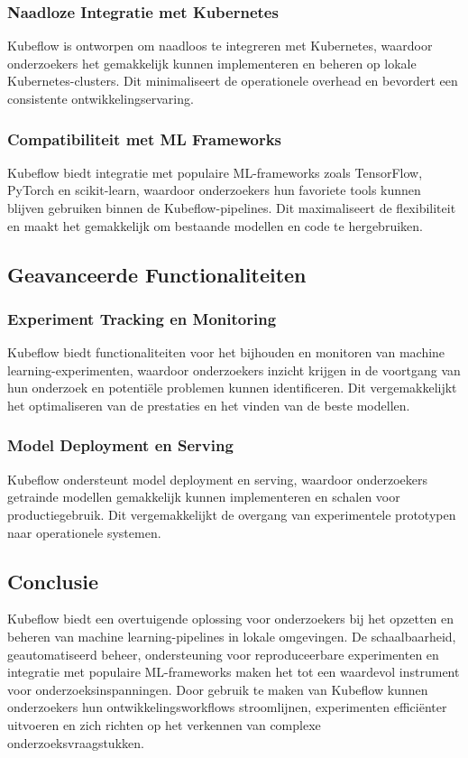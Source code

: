 \subsubsection{Naadloze Integratie met Kubernetes}
Kubeflow is ontworpen om naadloos te integreren met Kubernetes, waardoor onderzoekers het gemakkelijk kunnen implementeren en beheren op lokale Kubernetes-clusters. Dit minimaliseert de operationele overhead en bevordert een consistente ontwikkelingservaring.

\subsubsection{Compatibiliteit met ML Frameworks}
Kubeflow biedt integratie met populaire ML-frameworks zoals TensorFlow, PyTorch en scikit-learn, waardoor onderzoekers hun favoriete tools kunnen blijven gebruiken binnen de Kubeflow-pipelines. Dit maximaliseert de flexibiliteit en maakt het gemakkelijk om bestaande modellen en code te hergebruiken.

\subsection{Geavanceerde Functionaliteiten}

\subsubsection{Experiment Tracking en Monitoring}
Kubeflow biedt functionaliteiten voor het bijhouden en monitoren van machine learning-experimenten, waardoor onderzoekers inzicht krijgen in de voortgang van hun onderzoek en potentiële problemen kunnen identificeren. Dit vergemakkelijkt het optimaliseren van de prestaties en het vinden van de beste modellen.

\subsubsection{Model Deployment en Serving}
Kubeflow ondersteunt model deployment en serving, waardoor onderzoekers getrainde modellen gemakkelijk kunnen implementeren en schalen voor productiegebruik. Dit vergemakkelijkt de overgang van experimentele prototypen naar operationele systemen.

\subsection{Conclusie}

Kubeflow biedt een overtuigende oplossing voor onderzoekers bij het opzetten en beheren van machine learning-pipelines in lokale omgevingen. De schaalbaarheid, geautomatiseerd beheer, ondersteuning voor reproduceerbare experimenten en integratie met populaire ML-frameworks maken het tot een waardevol instrument voor onderzoeksinspanningen. Door gebruik te maken van Kubeflow kunnen onderzoekers hun ontwikkelingsworkflows stroomlijnen, experimenten efficiënter uitvoeren en zich richten op het verkennen van complexe onderzoeksvraagstukken.

